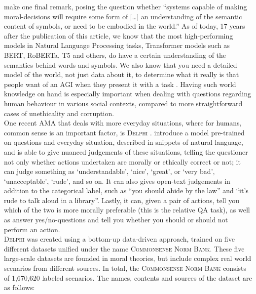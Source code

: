 \documentclass[final]{clv3} %
\begin{document}
\citet{allen2005} make one final remark, posing the question whether “systems capable of making moral-decisions will require some form of […] an understanding of the semantic content of symbols, or need to be embodied in the world.” As of today, 17 years after the publication of this article, we know that the most high-performing models in Natural Language Processing tasks, Transformer models such as BERT, RoBERTa, T5 and others, do have a certain understanding of the semantics behind words and symbols. We also know that you need a detailed model of the world, not just data about it, to determine what it really is that people want of an AGI when they present it with a task \cite{tegmark}. Having such world knowledge on hand is especially important when dealing with questions regarding human behaviour in various social contexts, compared to more straightforward cases of unethicality and corruption. \\

One recent AMA that deals with more everyday situations, where for humans, common sense is an important factor, is \textsc{Delphi} \cite{jiang}. \citet{jiang} introduce a model pre-trained on questions and everyday situation, described in snippets of natural language, and is able to give nuanced judgements of these situations, telling the questioner not only whether actions undertaken are morally or ethically correct or not; it can judge something as ‘understandable’, ‘nice’, ‘great’, or ‘very bad’, ‘unacceptable’, ‘rude’, and so on. It can also gives open-text judgements in addition to the categorical label, such as “you should abide by the law” and “it’s rude to talk aloud in a library”. Lastly, it can, given a pair of actions, tell you which of the two is more morally preferable (this is the relative QA task), as well as answer yes/no-questions and tell you whether you should or should not perform an action.\\

\textsc{Delphi} was created using a bottom-up data-driven approach, trained on five different datasets unified under the name \textsc{Commonsense Norm Bank}. These five large-scale datasets are founded in moral theories, but include complex real world scenarios from different sources. In total, the \textsc{Commonsense Norm Bank} consists of 1,670,620 labeled scenarios. The names, contents and sources of the dataset are as follows:
\end{document}
